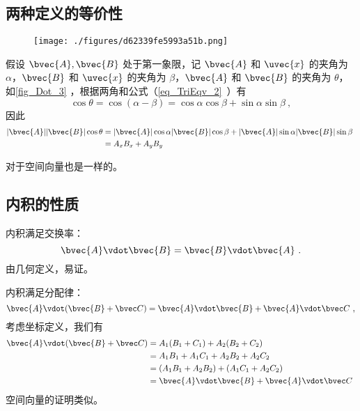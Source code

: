 \subsection{两种定义的等价性}
\begin{figure}[ht]
\centering
\texttt{[image: ./figures/d62339fe5993a51b.png]}
\caption{} \label{fig_Dot_3}
\end{figure}
假设 $\bvec{A}, \bvec{B}$ 处于第一象限，记 $\bvec{A}$ 和 $\uvec{x}$ 的夹角为 $\alpha$，$\bvec{B}$ 和 $\uvec{x}$ 的夹角为 $\beta$，$\bvec{A}$ 和 $\bvec{B}$ 的夹角为 $\theta$，如\autoref{fig_Dot_3} ，根据两角和公式（\autoref{eq_TriEqv_2}~）有
\begin{equation}
\cos\theta = \cos(\alpha-\beta) = \cos\alpha \cos\beta + \sin\alpha \sin\beta~,
\end{equation}
因此
\begin{equation}
\begin{aligned}
|\bvec{A}| |\bvec{B}| \cos\theta &= |\bvec{A}| \cos\alpha |\bvec{B}| \cos\beta + |\bvec{A}| \sin\alpha |\bvec{B}| \sin\beta \\
&= A_x B_x + A_y B_y
\end{aligned}~
\end{equation}


对于空间向量也是一样的。

\subsection{内积的性质}

内积满足交换率：
\begin{equation}\label{eq_Dot_2}
\bvec{A} \vdot \bvec{B} = \bvec{B} \vdot \bvec{A}~.
\end{equation}
由几何定义，易证。

内积满足分配律：
\begin{equation}\label{eq_Dot_3}
\bvec{A} \vdot (\bvec{B} + \bvec C) = \bvec{A} \vdot \bvec{B} + \bvec{A} \vdot \bvec C~,
\end{equation}
考虑坐标定义，我们有
\begin{equation}
\begin{aligned}
\bvec{A} \vdot (\bvec{B} + \bvec C) &= A_1 (B_1 + C_1) + A_2 (B_2 + C_2) \\
&= A_1 B_1 + A_1 C_1 + A_2 B_2 + A_2 C_2 \\
&= (A_1 B_1 + A_2 B_2) + (A_1 C_1 + A_2 C_2) \\
&= \bvec{A} \vdot \bvec{B} + \bvec{A} \vdot \bvec C
\end{aligned}~
\end{equation}
空间向量的证明类似。

